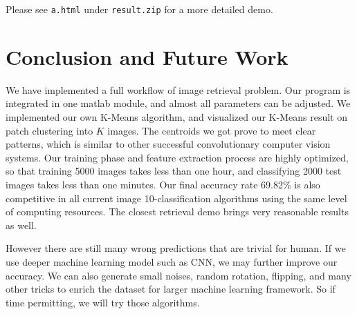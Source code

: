 \documentclass{acm_proc_article-sp}
\begin{document}
Please see \texttt{a.html} under \texttt{result.zip} for a more detailed demo.
\section{Conclusion and Future Work}
We have implemented a full workflow of image retrieval problem. Our program is
integrated in one matlab module, and almost all parameters can be adjusted. We
implemented our own K-Means algorithm, and visualized our K-Means result on
patch clustering into $K$ images. The centroids we got prove to meet clear
patterns, which is similar to other successful convolutionary computer vision
systems. Our training phase and feature extraction process are highly
optimized, so that training 5000 images takes less than one hour, and
classifying 2000 test images takes less than one minutes. Our final accuracy
rate 69.82\% is also competitive in all current image 10-classification
algorithms using the same level of computing resources. The closest retrieval
demo brings very reasonable results as well.

However there are still many wrong predictions that are trivial for human. If
we use deeper machine learning model such as CNN, we may further improve our
accuracy. We can also generate small noises, random rotation, flipping, and
many other tricks to enrich the dataset for larger machine learning framework.
So if time permitting, we will try those algorithms.

\nocite{*}

 

\balancecolumns{}
\end{document}
